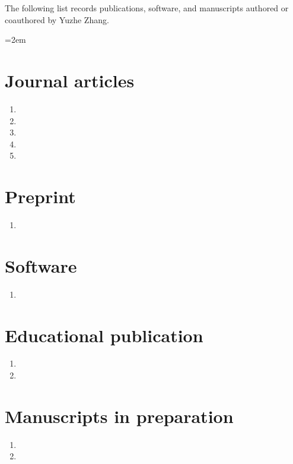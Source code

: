 
The following list records publications, software, and manuscripts authored or coauthored by Yuzhe Zhang.

\begingroup
\longcitenamestrue
\emergencystretch=2em
\section*{Journal articles}
\begin{enumerate}
    \item {}
    \item {}
    \item {}
    \item {}
    \item {}
\end{enumerate}

\section*{Preprint}
\begin{enumerate}
    \item {}
\end{enumerate}

\section*{Software}
\begin{enumerate}
    \item {}
\end{enumerate}
\section*{Educational publication}
\begin{enumerate}
    \item {}
    \item {}
\end{enumerate}
\section*{Manuscripts in preparation}
\begin{enumerate}
    \item {}
    \item {}
\end{enumerate}
\par\endgroup

